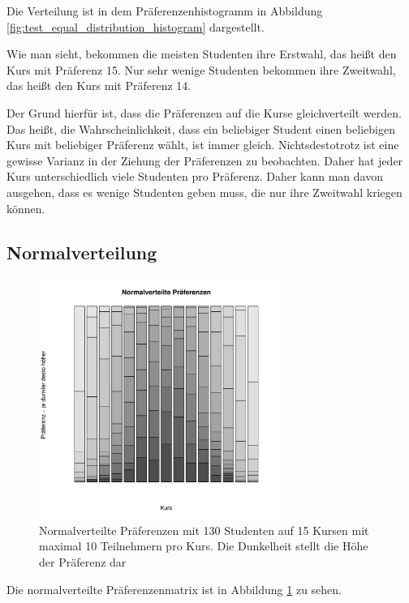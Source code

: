 			Die Verteilung ist in dem Präferenzenhistogramm in Abbildung \ref{fig:test_equal_distribution_histogram} dargestellt.\newline
			
			Wie man sieht, bekommen die meisten Studenten ihre Erstwahl, das heißt den Kurs mit Präferenz 15.
			Nur sehr wenige Studenten bekommen ihre Zweitwahl, das heißt den Kurs mit Präferenz 14.\newline
			
			Der Grund hierfür ist, dass die Präferenzen auf die Kurse gleichverteilt werden.
			Das heißt, die Wahrscheinlichkeit, dass ein beliebiger Student einen beliebigen Kurs mit beliebiger Präferenz wählt, ist immer gleich.
			Nichtsdestotrotz ist eine gewisse Varianz in der Ziehung der Präferenzen zu beobachten.
			Daher hat jeder Kurs unterschiedlich viele Studenten pro Präferenz.
			Daher kann man davon ausgehen, dass es wenige Studenten geben muss, die nur ihre Zweitwahl kriegen können.\newline
		
		\subsection{Normalverteilung}
		\label{sec:testing:normaldistribution}
		
			\begin{figure}
				\centering
				\includegraphics[width=0.7\textwidth]{./testing/images/NormalDistPreferencesDist.jpg}
				\caption{Normalverteilte Präferenzen mit 130 Studenten auf 15 Kursen mit maximal 10 Teilnehmern pro Kurs. Die Dunkelheit stellt die Höhe der Präferenz dar}
				\label{fig:test_norm_distribution}
			\end{figure}
			Die normalverteilte Präferenzenmatrix ist in Abbildung \ref{fig:test_norm_distribution} zu sehen.
			
